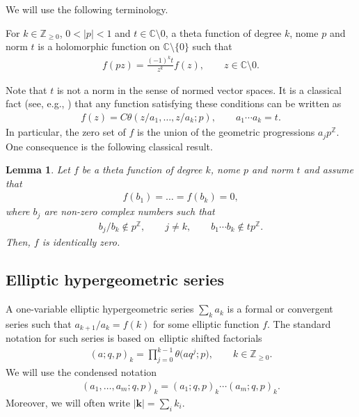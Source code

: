 \documentclass[pdftex]{sigma}%
\numberwithin{equation}{section}
\newtheorem{Lemma}[Theorem]{Lemma}
 { \theoremstyle{definition}
\newtheorem{Definition}[Theorem]{Definition}
\newtheorem{Remark}[Theorem]{Remark} }
\begin{document}
We will use the following terminology.

\begin{Definition}\label{htfd}
For $k\in\mathbb Z_{\geq 0}$, $0<|p|<1$ and $t\in\mathbb C\setminus{0}$,
a theta function of degree $k$, nome $p$ and norm $t$ is a
holomorphic function on $\mathbb C\setminus\{0\}$ such that
\begin{gather*}
f(pz)=\frac{(-1)^kt}{z^k} f(z),\qquad
z\in\mathbb C\setminus{0}.
\end{gather*}
\end{Definition}

Note that $t$ is not a norm in the sense of normed vector spaces.
It is a classical fact (see, e.g., \cite[Corollary~1.3.5]{rln}) that any function satisfying these conditions can be written as
\begin{gather*}
f(z)=C \theta(z/a_1,\dots,z/a_k;p), \qquad a_1\dotsm a_k=t.
\end{gather*}
In particular, the zero set of $f$ is the union of the geometric progressions $a_jp^{\mathbb Z}$. One consequence is the following classical result.


\begin{Lemma}\label{tvl}
 Let $f$ be a theta function of degree $k$, nome $p$ and norm $t$ and assume that
 \begin{gather*}
 f(b_1)=\dots=f(b_k)=0,
 \end{gather*}
where $b_j$ are non-zero complex numbers such that
\begin{gather*}
b_j/b_k\notin p^{\mathbb Z}, \qquad
j\neq k,\qquad
b_1\dotsm b_k\notin tp^{\mathbb Z}.
\end{gather*}
 Then, $f$ is identically zero.
\end{Lemma}



\subsection{Elliptic hypergeometric series}

A one-variable elliptic hypergeometric series $\sum_k a_k$ is a formal or convergent series such that $a_{k+1}/a_k=f(k)$ for some elliptic function $f$. The standard notation for such series is based on~elliptic shifted factorials
\begin{gather*}
(a;q,p)_k=\prod\limits_{j=0}^{k-1}\theta\big(aq^j;p\big),\qquad
k\in\mathbb Z_{\geq 0}.
\end{gather*}
We will use the condensed notation
\begin{gather*}
(a_1,\dots,a_m;q,p)_k=(a_1;q,p)_k\dotsm (a_m;q,p)_k.
\end{gather*}
Moreover, we will often write $|\mathbf k|=\sum_i k_i$.
\end{document}
